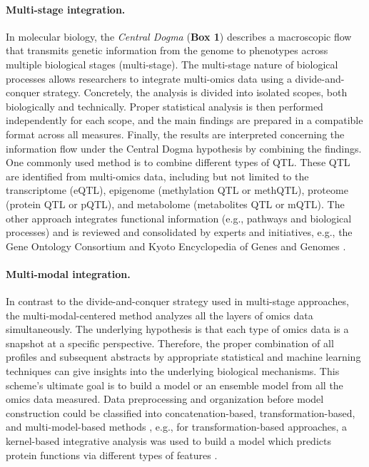 \documentclass{book}
\begin{document}
\begin{refsection}
\paragraph*{Multi-stage integration.} In molecular biology, the \textit{Central Dogma} (\textbf{Box 1}) describes a macroscopic flow that transmits genetic information from the genome to phenotypes across multiple biological stages (multi-stage).
The multi-stage nature of biological processes allows researchers to integrate multi-omics data using a divide-and-conquer strategy.
Concretely, the analysis is divided into isolated scopes, both biologically and technically.
Proper statistical analysis is then performed independently for each scope, and the main findings are prepared in a compatible format across all measures.
Finally, the results are interpreted concerning the information flow under the Central Dogma hypothesis by combining the findings.
One commonly used method is to combine different types of QTL.
These QTL are identified from multi-omics data, including but not limited to the transcriptome (eQTL), epigenome (methylation QTL or methQTL), proteome (protein QTL or pQTL), and metabolome (metabolites QTL or mQTL).
The other approach integrates functional information (e.g., pathways and biological processes) and is reviewed and consolidated by experts and initiatives, e.g., the Gene Ontology Consortium \cite{Ashburner2000Gene,Carbon2020The} and Kyoto Encyclopedia of Genes and Genomes \cite{Kanehisa2000KEGG}.

\paragraph*{Multi-modal integration.} In contrast to the divide-and-conquer strategy used in multi-stage approaches, the multi-modal-centered method analyzes all the layers of omics data simultaneously.
The underlying hypothesis is that each type of omics data is a snapshot at a specific perspective.
Therefore, the proper combination of all profiles and subsequent abstracts by appropriate statistical and machine learning techniques can give insights into the underlying biological mechanisms.
This scheme’s ultimate goal is to build a model or an ensemble model from all the omics data measured.
Data preprocessing and organization before model construction could be classified into concatenation-based, transformation-based, and multi-model-based methods \cite{Ritchie2015Methods}, e.g., for transformation-based approaches, a kernel-based integrative analysis was used to build a model which predicts protein functions via different types of features \cite{Lanckriet2004A}.



\end{refsection}
\end{document}

